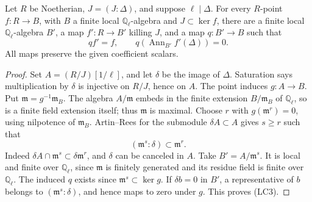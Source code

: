 \begin{srlemma}\label{lem:sr-saturated-artinian-lift}
Let \(R\) be Noetherian, \(J=(J:\Delta)\), and suppose
\(\ell\mid\Delta\).
For every \(R\)-point \(f:R\to B\), with \(B\) a finite local
\(\mathbb Q_\ell\)-algebra and \(J\subset\ker f\), there are
a finite local \(\mathbb Q_\ell\)-algebra \(B'\), a map
\(f':R\to B'\) killing \(J\), and a map \(q:B'\to B\)
such that
\[
 qf'=f,\qquad q(\operatorname{Ann}_{B'}f'(\Delta))=0 .
 \tag{LC3}
\]
All maps preserve the given coefficient scalars.
\end{srlemma}
\begin{proof}
Set \(A=(R/J)[1/\ell]\), and let \(\delta\) be the image of
\(\Delta\).
Saturation says multiplication by \(\delta\) is injective on
\(R/J\), hence on \(A\).
The point induces \(g:A\to B\).
Put \(\mathfrak m=g^{-1}\mathfrak m_B\).
The algebra \(A/\mathfrak m\) embeds in the finite extension
\(B/\mathfrak m_B\) of \(\mathbb Q_\ell\), so is a finite
field extension itself; thus \(\mathfrak m\) is maximal.
Choose \(r\) with
\(g(\mathfrak m^r)=0\), using nilpotence of \(\mathfrak m_B\).
Artin--Rees for the submodule \(\delta A\subset A\) gives
\(s\ge r\) such that
\[
              (\mathfrak m^s:\delta)\subset\mathfrak m^r.
\]
Indeed
\(\delta A\cap\mathfrak m^s\subset\delta\mathfrak m^r\),
and \(\delta\) can be canceled in \(A\).
Take \(B'=A/\mathfrak m^s\).
It is local and finite over \(\mathbb Q_\ell\), since
\(\mathfrak m\) is finitely generated and its residue field
is finite over \(\mathbb Q_\ell\).
The induced \(q\) exists since
\(\mathfrak m^s\subset\ker g\).
If \(\delta b=0\) in \(B'\), a representative of \(b\)
belongs to \((\mathfrak m^s:\delta)\), and hence maps
to zero under \(g\).
This proves (LC3).
\end{proof}

